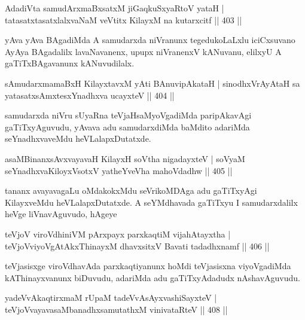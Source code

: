 
\begin{shl}
AdadiVta samudArxmaBxsatxM jiGaqkuSxyaRtoV yataH |
tatasatxtasatxlalxvaNaM veVtitx KilayxM na kutarxcitf \hfill || 403 ||
\end{shl}

\begin{artha}
yAva yAva BAgadiMda A samudarxda niVranunx tegedukoLaLxlu iciCxsuvano AyAya BAgadalilx lavaNavanenx, upupx niVranenxV kANuvanu, elilxyU A gaTiTxBAgavanunx kANuvudilalx.
\end{artha}


\begin{shl}
sAmudarxmamaBxH KilayxtavxM yAti BAnuvipAkataH |
sinodhxVrAyAtaH sa yatasatxsAmxtesxYnadhxva ucayxteV \hfill || 404 ||
\end{shl}

\begin{artha}
samudarxda niVru sUyaRna teVjaHsaMyoVgadiMda paripAkavAgi gaTiTxyAguvudu, yAvava adu samudarxdiMda baMdito adariMda seYnadhxvaveMdu heVLalapxDutatxde.
\end{artha}

\begin{shl}
asaMBinanxsAvxvayavaH KilayxH soV\s tha nigadayxteV |
soV\s yaM seYnadhxvaKiloyxV\s sotxV yatheYveVha mahoVdadhw \hfill || 405 ||
\end{shl}

\begin{artha}
tananx avayavagaLu oMdakokxMdu seVrikoMDAga adu gaTiTxyAgi KilayxveMdu heVLalapxDutatxde. A seYMdhavada gaTiTxyu I samudarxdalilx heVge liVnavAguvudo, hAgeye \mdash 
\end{artha}

\begin{shl}
teVjoV viroVdhiniVM pArxpayx parxkaqtiM vija{hA}tayxtha |
teVjoVviyoVgAtAkxThinayxM dhavxsitxV Bavati tadadhxnamf \hfill || 406 ||
\end{shl}

\begin{artha}
teVjasisxge viroVdhavAda parxkaqtiyanunx hoMdi teVjasisxna viyoVgadiMda kAThinayxvanunx biDuvudu, adariMda adu gaTiTxyAdadudx nAshavAguvudu.
\end{artha}

\begin{shl}
yadeVvAkaqtirxmaM rUpaM tadeVvAsAyxvashiSayxteV |
teVjoVvayavasaMbanadhxsamutathxM vinivataRteV \hfill || 408 ||
\end{shl}

